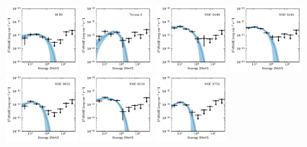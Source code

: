 \documentclass[doublespace,draft,nopageskip]{VTthesis} %
\begin{document}
\begin{appendices}
\begin{figure}
\centering
\includegraphics[width=0.24\textwidth]{Figures/Globular/spectra/PLE_spectrum_8.pdf}
\includegraphics[width=0.24\textwidth]{Figures/Globular/spectra/PLE_spectrum_28.pdf}
\includegraphics[width=0.24\textwidth]{Figures/Globular/spectra/PLE_spectrum_18.pdf}
\includegraphics[width=0.24\textwidth]{Figures/Globular/spectra/PLE_spectrum_19.pdf}
\includegraphics[width=0.24\textwidth]{Figures/Globular/spectra/PLE_spectrum_22.pdf}
\includegraphics[width=0.24\textwidth]{Figures/Globular/spectra/PLE_spectrum_13.pdf}
\includegraphics[width=0.24\textwidth]{Figures/Globular/spectra/PLE_spectrum_24.pdf}

\end{figure}
\end{appendices}
\end{document}
